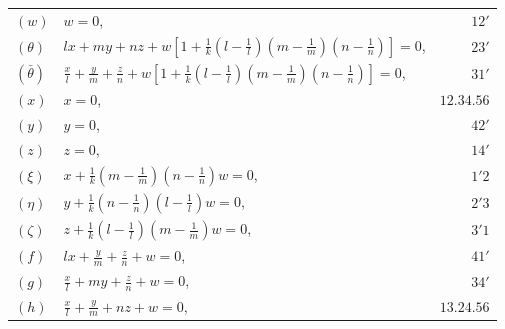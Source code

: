 \documentclass[12pt,a4paper]{article}
\begin{document}
\begin{center}
\begin{tabular}{@{}l@{\qquad}l@{\qquad}r@{}}
$(w)$ & $w = 0$, & $12'$ \\[4pt]
$(\theta)$ & $\displaystyle lx + my + nz + w\left[1 + \frac{1}{k}\left(l - \frac{1}{l}\right)\left(m - \frac{1}{m}\right)\left(n - \frac{1}{n}\right)\right] = 0$, & $23'$ \\[4pt]
$(\bar{\theta})$ & $\displaystyle \frac{x}{l} + \frac{y}{m} + \frac{z}{n} + w\left[1 + \frac{1}{k}\left(l - \frac{1}{l}\right)\left(m - \frac{1}{m}\right)\left(n - \frac{1}{n}\right)\right] = 0$, & $31'$ \\[4pt]
$(x)$ & $x = 0$, & $12.34.56$ \\[4pt]
$(y)$ & $y = 0$, & $42'$ \\[4pt]
$(z)$ & $z = 0$, & $14'$ \\[4pt]
$(\xi)$ & $\displaystyle x + \frac{1}{k}\left(m - \frac{1}{m}\right)\left(n - \frac{1}{n}\right)w = 0$, & $1'2$ \\[4pt]
$(\eta)$ & $\displaystyle y + \frac{1}{k}\left(n - \frac{1}{n}\right)\left(l - \frac{1}{l}\right)w = 0$, & $2'3$ \\[4pt]
$(\zeta)$ & $\displaystyle z + \frac{1}{k}\left(l - \frac{1}{l}\right)\left(m - \frac{1}{m}\right)w = 0$, & $3'1$ \\[4pt]
$(f)$ & $\displaystyle lx + \frac{y}{m} + \frac{z}{n} + w = 0$, & $41'$ \\[4pt]
$(g)$ & $\displaystyle \frac{x}{l} + my + \frac{z}{n} + w = 0$, & $34'$ \\[4pt]
$(h)$ & $\displaystyle \frac{x}{l} + \frac{y}{m} + nz + w = 0$, & $13.24.56$
\end{tabular}
\end{center}
\end{document}
